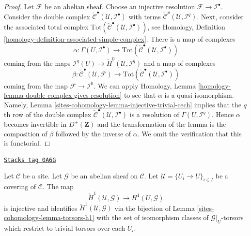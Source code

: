 \begin{proof}
Let $\mathcal{F}$ be an abelian sheaf. Choose an injective resolution
$\mathcal{F} \to \mathcal{I}^\bullet$. Consider the double complex
$\check{\mathcal{C}}^\bullet(\mathcal{U}, \mathcal{I}^\bullet)$
with terms $\check{\mathcal{C}}^p(\mathcal{U}, \mathcal{I}^q)$.
Next, consider the associated total complex
$\text{Tot}(\check{\mathcal{C}}^\bullet(\mathcal{U}, \mathcal{I}^\bullet))$,
see Homology, Definition \ref{homology-definition-associated-simple-complex}.
There is a map of complexes
$$
\alpha :
\Gamma(U, \mathcal{I}^\bullet)
\longrightarrow
\text{Tot}(\check{\mathcal{C}}^\bullet(\mathcal{U}, \mathcal{I}^\bullet))
$$
coming from the maps
$\mathcal{I}^q(U) \to \check{H}^0(\mathcal{U}, \mathcal{I}^q)$
and a map of complexes
$$
\beta :
\check{\mathcal{C}}^\bullet(\mathcal{U}, \mathcal{F})
\longrightarrow
\text{Tot}(\check{\mathcal{C}}^\bullet(\mathcal{U}, \mathcal{I}^\bullet))
$$
coming from the map $\mathcal{F} \to \mathcal{I}^0$.
We can apply
Homology, Lemma \ref{homology-lemma-double-complex-gives-resolution}
to see that $\alpha$ is a quasi-isomorphism.
Namely, Lemma \ref{sites-cohomology-lemma-injective-trivial-cech} implies that
the $q$th row of the double complex
$\check{\mathcal{C}}^\bullet(\mathcal{U}, \mathcal{I}^\bullet)$ is a
resolution of $\Gamma(U, \mathcal{I}^q)$.
Hence $\alpha$ becomes invertible in $D^{+}(\mathbf{Z})$ and
the transformation of the lemma is the composition of $\beta$
followed by the inverse of $\alpha$. We omit the verification
that this is functorial.
\end{proof}

\begin{lemma}[Cech h1]
\label{sites-cohomology-lemma-cech-h1}
\href{https://stacks.math.columbia.edu/tag/0A6G}{\texttt{Stacks tag 0A6G}}

Let $\mathcal{C}$ be a site. Let $\mathcal{G}$ be an abelian sheaf
on $\mathcal{C}$. Let $\mathcal{U} = \{U_i \to U\}_{i \in I}$ be a
covering of $\mathcal{C}$. The map
$$
\check{H}^1(\mathcal{U}, \mathcal{G})
\longrightarrow
H^1(U, \mathcal{G})
$$
is injective and identifies $\check{H}^1(\mathcal{U}, \mathcal{G})$ via
the bijection of Lemma \ref{sites-cohomology-lemma-torsors-h1}
with the set of isomorphism classes of $\mathcal{G}|_U$-torsors
which restrict to trivial torsors over each $U_i$.
\end{lemma}

